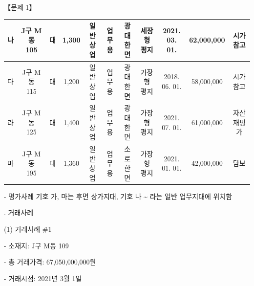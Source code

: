 \begin{longquestion}{【문제 1】}
{\begin{tabular}{|c|c|c|c|c|c|c|c|c|c|c|}
나 & \makecell{J구 M동\\105} & 대 & 1,300 & \makecell{일반\\상업} & \makecell{업무\\용} & \makecell{광대\\한면} & \makecell{세장형\\평지} & \makecell{2021.\\03. 01.} & 62,000,000 & \makecell{시가\\참고} \\\hline
다 & \makecell{J구 M동\\115} & 대 & 1,200 & \makecell{일반\\상업} & \makecell{업무\\용} & \makecell{광대\\한면} & \makecell{가장형\\평지} & \makecell{2018.\\06. 01.} & 58,000,000 & \makecell{시가\\참고} \\\hline
라 & \makecell{J구 M동\\125} & 대 & 1,400 & \makecell{일반\\상업} & \makecell{업무\\용} & \makecell{광대\\한면} & \makecell{가장형\\평지} & \makecell{2021.\\07. 01.} & 61,000,000 & \makecell{자산\\재평가} \\\hline
마 & \makecell{J구 M동\\195} & 대 & 1,360 & \makecell{일반\\상업} & \makecell{업무\\용} & \makecell{소로\\한면} & \makecell{가장형\\평지} & \makecell{2021.\\01. 01.} & 42,000,000 & 담보 \\\hline
\end{tabular}\par}
- 평가사례 기호 가, 마는 후면 상가지대, 기호 나 \textasciitilde{} 라는 일반 업무지대에 위치함 \par
\medskip{}. 거래사례 \par
(1) 거래사례 \#1 \par
- 소재지: J구 M동 109 \par
- 총 거래가격: 67,050,000,000원 \par
- 거래시점: 2021년 3월 1일 \par

\end{longquestion}
